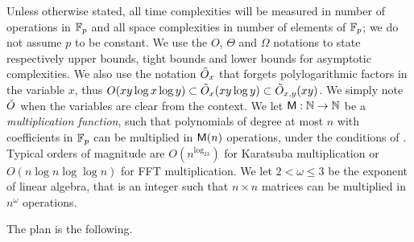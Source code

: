 Unless otherwise stated, all time complexities will be measured in
number of operations in $\mathbb{F}_p$ and all space complexities in number of
elements of $\mathbb{F}_p$; we do not assume $p$ to be constant. We use the
$O$, $\Theta$ and $\Omega$ notations to state respectively upper
bounds, tight bounds and lower bounds for asymptotic complexities. We
also use the notation $\tilde{O}_x$ that forgets polylogarithmic factors
in the variable $x$, thus $O(xy\log x \log y)\subset\tilde{O}_x(xy\log
y)\subset\tilde{O}_{x,y}(xy)$. We simply note $\tilde{O}$ when the variables
are clear from the context. We let $\mathrm{\sf M}:\mathbb{N}\rightarrow\mathbb{N}$ be a
\emph{multiplication function}, such that polynomials of degree at
most $n$ with coefficients in $\mathbb{F}_p$ can be multiplied in $\mathrm{\sf M}(n)$
operations, under the conditions of \cite[Ch. 8.3]{vzGG}. Typical
orders of magnitude are $O(n^{\log_23})$ for Karatsuba multiplication
or $O(n\log n\log\log n)$ for FFT multiplication. We let
$2<\omega\le3$ be the exponent of linear algebra, that is an integer
such that $n\times n$ matrices can be multiplied in $n^\omega$
operations.

The plan is the following. \todo


%

